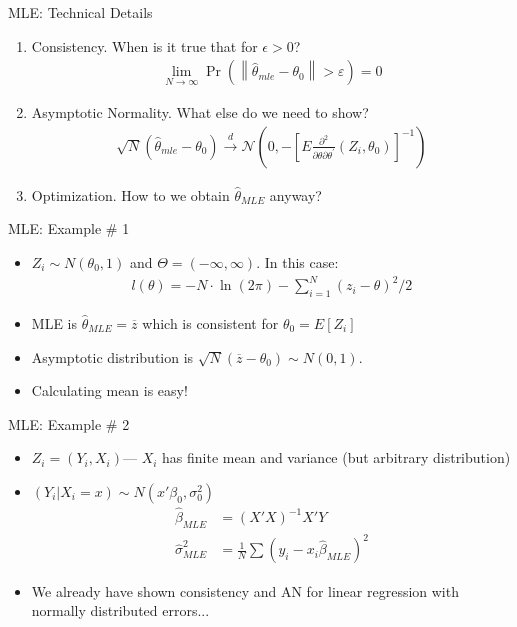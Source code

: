 \documentclass[aspectratio=169]{beamer}
\begin{document}
\begin{frame}{MLE: Technical Details}
\begin{enumerate}
\item Consistency. When is it true that for $\epsilon>0$?
\begin{align*}
\lim _ { N \rightarrow \infty } \operatorname { Pr } \left( \left\| \hat { \theta } _ { m l e } - \theta _ { 0 } \right\| > \varepsilon \right) = 0
\end{align*}
\item Asymptotic Normality. What else do we need to show?
\begin{align*}
\sqrt { N } \left( \hat { \theta } _ { m l e } - \theta _ { 0 } \right) \stackrel { d } { \longrightarrow } \mathcal { N } \left( 0 , - \left[ E \frac { \partial ^ { 2 } } { \partial \theta \partial \theta ^ { \prime } } \left( Z _ { i } , \theta _ { 0 } \right) \right] ^ { - 1 } \right)
\end{align*}
\item Optimization. How to we obtain $\widehat{\theta}_{MLE}$ anyway?
\end{enumerate}
\end{frame}


\begin{frame}{MLE: Example \# 1}
\begin{itemize}
\item $Z_i \sim N(\theta_0,1)$ and $\Theta = (-\infty,\infty)$. In this case:
\begin{align*}
l ( \theta ) = - N \cdot \ln ( 2 \pi ) - \sum _ { i = 1 } ^ { N } \left( z _ { i } - \theta \right) ^ { 2 } / 2
\end{align*}
\item MLE is $\widehat{\theta}_{MLE}=\overline{z}$ which is consistent for $\theta_0 = E[Z_i]$
\item Asymptotic distribution is $\sqrt{N} ( \overline{z}-\theta_0) \sim N(0,1)$.
\item Calculating mean is easy!
\end{itemize}
\end{frame}




\begin{frame}{MLE: Example \# 2}
\begin{itemize}
\item $Z_i = (Y_i, X_i)$---   $X_i$ has finite mean and variance (but arbitrary distribution)
\item $(Y_i | X_i  =x) \sim N(x' \beta_0, \sigma_0^2)$
\begin{align*}
\widehat{\beta}_{MLE} &= (X'X)^{-1} X'Y\\
\widehat{\sigma}^2_{MLE} &= \frac{1}{N} \sum (y_i - x_i \widehat{\beta}_{MLE})^2
\end{align*}
\item We already have shown consistency and AN for linear regression with normally distributed errors...
\end{itemize}
\end{frame}
\end{document}
